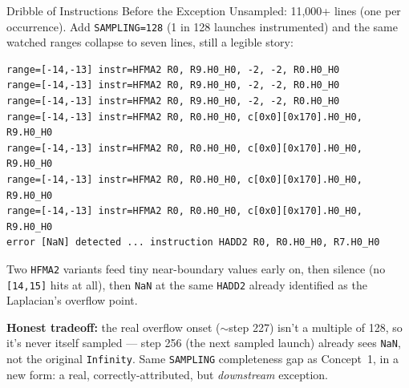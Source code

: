 \documentclass{beamer}
\begin{document}
\begin{frame}[fragile]{Dribble of Instructions Before the Exception}
Unsampled: 11,000+ lines (one per occurrence). Add \texttt{SAMPLING=128}
(1 in 128 launches instrumented) and the same watched ranges collapse to
seven lines, still a legible story:
\begin{lstlisting}[basicstyle=\ttfamily\tiny]
range=[-14,-13] instr=HFMA2 R0, R9.H0_H0, -2, -2, R0.H0_H0
range=[-14,-13] instr=HFMA2 R0, R9.H0_H0, -2, -2, R0.H0_H0
range=[-14,-13] instr=HFMA2 R0, R9.H0_H0, -2, -2, R0.H0_H0
range=[-14,-13] instr=HFMA2 R0, R0.H0_H0, c[0x0][0x170].H0_H0, R9.H0_H0
range=[-14,-13] instr=HFMA2 R0, R0.H0_H0, c[0x0][0x170].H0_H0, R9.H0_H0
range=[-14,-13] instr=HFMA2 R0, R0.H0_H0, c[0x0][0x170].H0_H0, R9.H0_H0
range=[-14,-13] instr=HFMA2 R0, R0.H0_H0, c[0x0][0x170].H0_H0, R9.H0_H0
error [NaN] detected ... instruction HADD2 R0, R0.H0_H0, R7.H0_H0
\end{lstlisting}
Two \texttt{HFMA2} variants feed tiny near-boundary values early on, then
silence (no \texttt{[14,15]} hits at all), then \texttt{NaN} at the same
\texttt{HADD2} already identified as the Laplacian's overflow point.

\vspace{0.15cm}
\textbf{Honest tradeoff:} the real overflow onset ($\sim$step 227) isn't a
multiple of 128, so it's never itself sampled --- step 256 (the next
sampled launch) already sees \texttt{NaN}, not the original
\texttt{Infinity}. Same \texttt{SAMPLING} completeness gap as Concept~1,
in a new form: a real, correctly-attributed, but \emph{downstream}
exception.
\end{frame}
\end{document}
